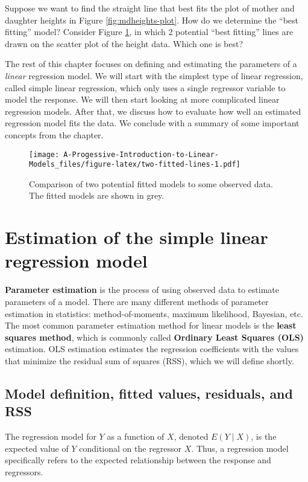 \documentclass[
]{book}
\theoremstyle{definition}
\theoremstyle{definition}
\theoremstyle{definition}
\theoremstyle{definition}
\theoremstyle{remark}
\begin{document}
Suppose we want to find the straight line that best fits the plot of mother and daughter heights in Figure \ref{fig:mdheights-plot}. How do we determine the ``best fitting'' model? Consider Figure \ref{fig:two-fitted-lines}, in which 2 potential ``best fitting'' lines are drawn on the scatter plot of the height data. Which one is best?

The rest of this chapter focuses on defining and estimating the parameters of a \emph{linear} regression model. We will start with the simplest type of linear regression, called simple linear regression, which only uses a single regressor variable to model the response. We will then start looking at more complicated linear regression models. After that, we discuss how to evaluate how well an estimated regression model fits the data. We conclude with a summary of some important concepts from the chapter.

\begin{figure}
\centering
\texttt{[image: A-Progessive-Introduction-to-Linear-Models\_files/figure-latex/two-fitted-lines-1.pdf]}
\caption{\label{fig:two-fitted-lines}Comparison of two potential fitted models to some observed data. The fitted models are shown in grey.}
\end{figure}

\hypertarget{s-slr-estimation}{%
\section{Estimation of the simple linear regression model}\label{s-slr-estimation}}

\textbf{Parameter estimation} is the process of using observed data to estimate parameters of a model. There are many different methods of parameter estimation in statistics: method-of-moments, maximum likelihood, Bayesian, etc. The most common parameter estimation method for linear models is the \textbf{least squares method}, which is commonly called \textbf{Ordinary Least Squares (OLS)} estimation. OLS estimation estimates the regression coefficients with the values that minimize the residual sum of squares (RSS), which we will define shortly.

\hypertarget{ss:fv-resid-rss}{%
\subsection{Model definition, fitted values, residuals, and RSS}\label{ss:fv-resid-rss}}

The regression model for \(Y\) as a function of \(X\), denoted \(E(Y \mid X)\), is the expected value of \(Y\) conditional on the regressor \(X\). Thus, a regression model specifically refers to the expected relationship between the response and regressors.
\end{document}

